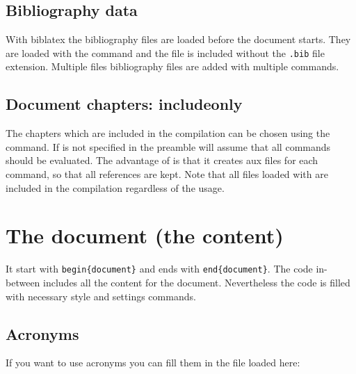 \subsection{Bibliography data}
\label{sec:preamble:bibfiles}
With biblatex the bibliography files are loaded before the document starts. 
They are loaded with the command  and the file is included without the \texttt{.bib} file extension. Multiple files bibliography files are added with multiple  commands.

\subsection{Document chapters: includeonly}
\label{sec:preamble:includeonly}
The chapters which are included in the compilation can be chosen using the  command. If  is not specified in the preamble \latex will assume that all  commands should be evaluated. The advantage of  is that it creates aux files for each  command, so that all references are kept. Note that all files loaded with  are included in the compilation regardless of the  usage.


\section{The document (the content)}
\label{sec:doc:document}
It start with \texttt{\bs{}begin\{document\}} and ends with \texttt{\bs{}end\{document\}}.
The code in-between includes all the content for the document. Nevertheless the code is filled with necessary style and settings commands.

\subsection{Acronyms}
\label{sec:document:acronyms}
If you want to use acronyms you can fill them in the file 
 loaded here:
%
